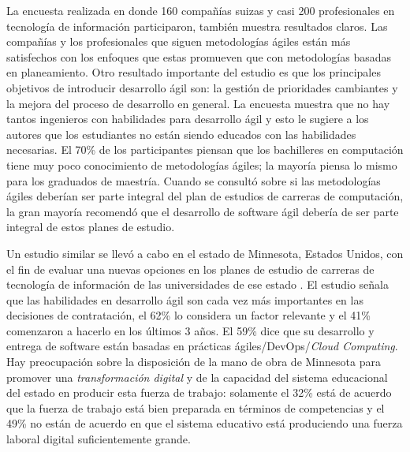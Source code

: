 \documentclass[journal]{IEEEtran}
\begin{document}
La encuesta realizada en \cite{kropp-meier-1} donde 160 compañías suizas y casi 200 profesionales en tecnología de información participaron, también muestra resultados claros. Las compañías y los profesionales que siguen metodologías ágiles están más satisfechos con los enfoques que estas promueven que con metodologías basadas en planeamiento. Otro resultado importante del estudio es que los principales objetivos de introducir desarrollo ágil son: la gestión de prioridades cambiantes y la mejora del proceso de desarrollo en general. La encuesta muestra que no hay tantos ingenieros con habilidades para desarrollo ágil y esto le sugiere a los autores que los estudiantes no están siendo educados con las habilidades necesarias. El 70\% de los participantes piensan que los bachilleres en computación tiene muy poco conocimiento de metodologías ágiles; la mayoría piensa lo mismo para los graduados de maestría. Cuando se consultó sobre si las metodologías ágiles deberían ser parte integral del plan de estudios de carreras de computación, la gran mayoría recomendó que el desarrollo de software ágil debería de ser parte integral de estos planes de estudio.

Un estudio similar se llevó a cabo en el estado de Minnesota, Estados Unidos, con el fin de evaluar una nuevas opciones en los planes de estudio de carreras de tecnología de información de las universidades de ese estado \cite{advance-it}. El estudio señala que las habilidades en desarrollo ágil son cada vez más importantes en las decisiones de contratación, el 62\% lo considera un factor relevante y el 41\% comenzaron a hacerlo en los últimos 3 años. El 59\% dice que su desarrollo y entrega de software están basadas en prácticas ágiles/DevOps/\emph{Cloud Computing}. Hay preocupación sobre la disposición de la mano de obra de Minnesota para promover una \emph{transformación digital} y de la capacidad del sistema educacional del estado en producir esta fuerza de trabajo: solamente el 32\% está de acuerdo que la fuerza de trabajo está bien preparada en términos de competencias y el 49\% no están de acuerdo en que el sistema educativo está produciendo una fuerza laboral digital suficientemente grande.
\end{document}
